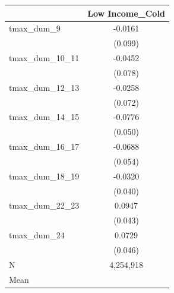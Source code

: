 {
\def\sym#1{\ifmmode^{#1}\else\(^{#1}\)\fi}
\begin{tabular}{l*{1}{c}}
\toprule
            &\multicolumn{1}{c}{Low Income\_Cold}\\
\midrule
tmax\_dum\_9  &     -0.0161         \\
            &     (0.099)         \\
tmax\_dum\_10\_11&     -0.0452         \\
            &     (0.078)         \\
tmax\_dum\_12\_13&     -0.0258         \\
            &     (0.072)         \\
tmax\_dum\_14\_15&     -0.0776         \\
            &     (0.050)         \\
tmax\_dum\_16\_17&     -0.0688         \\
            &     (0.054)         \\
tmax\_dum\_18\_19&     -0.0320         \\
            &     (0.040)         \\
tmax\_dum\_22\_23&      0.0947 \\
            &     (0.043)         \\
tmax\_dum\_24 &      0.0729         \\
            &     (0.046)         \\
\midrule
N           &   4,254,918         \\
Mean        &                     \\
\bottomrule
\end{tabular}
}
